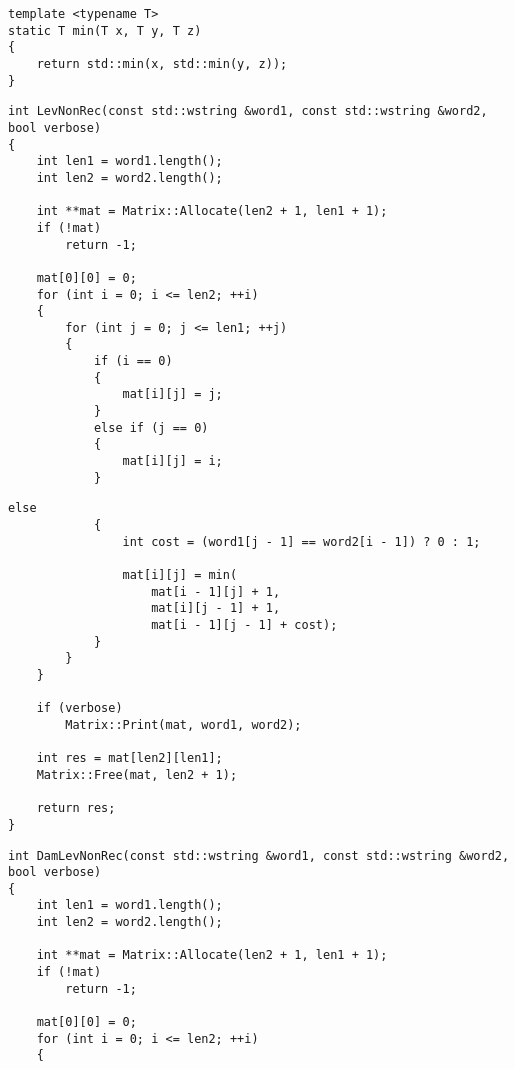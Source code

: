 \begin{lstlisting}[caption={Функция \texttt{max}, используемая в алгоритмах}]
template <typename T>
static T min(T x, T y, T z)
{
    return std::min(x, std::min(y, z));
}
\end{lstlisting}

\begin{lstlisting}[caption=Матричный алгоритм поиска расстояния Левенштейна (часть 1)]
int LevNonRec(const std::wstring &word1, const std::wstring &word2, bool verbose)
{
    int len1 = word1.length();
    int len2 = word2.length();

    int **mat = Matrix::Allocate(len2 + 1, len1 + 1);
    if (!mat)
        return -1;

    mat[0][0] = 0;
    for (int i = 0; i <= len2; ++i)
    {
        for (int j = 0; j <= len1; ++j)
        {
            if (i == 0)
            {
                mat[i][j] = j;
            }
            else if (j == 0)
            {
                mat[i][j] = i;
            }
\end{lstlisting}

\clearpage
\begin{lstlisting}[caption=Матричный алгоритм поиска расстояния Левенштейна (часть 2)]
            else
            {
                int cost = (word1[j - 1] == word2[i - 1]) ? 0 : 1;

                mat[i][j] = min(
                    mat[i - 1][j] + 1,
                    mat[i][j - 1] + 1,
                    mat[i - 1][j - 1] + cost);
            }
        }
    }

    if (verbose)
        Matrix::Print(mat, word1, word2);

    int res = mat[len2][len1];
    Matrix::Free(mat, len2 + 1);

    return res;
}
\end{lstlisting}

\begin{lstlisting}[caption=Матричный алгоритм поиска расстояния Дамерау\,--\,Левенштейна (часть 1)]
int DamLevNonRec(const std::wstring &word1, const std::wstring &word2, bool verbose)
{
    int len1 = word1.length();
    int len2 = word2.length();

    int **mat = Matrix::Allocate(len2 + 1, len1 + 1);
    if (!mat)
        return -1;

    mat[0][0] = 0;
    for (int i = 0; i <= len2; ++i)
    {
\end{lstlisting}

